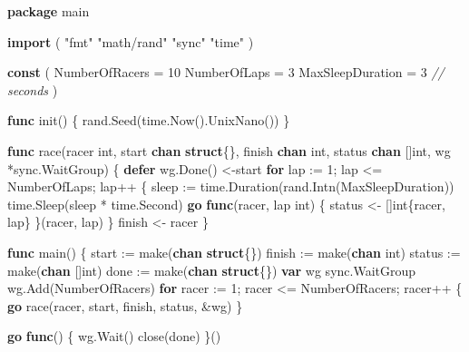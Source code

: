 \documentclass[]{book}
\newenvironment{Shaded}{\begin{snugshade}}{\end{snugshade}}
\newcommand{\BuiltInTok}[1]{#1}
\newcommand{\CommentTok}[1]{\textcolor[rgb]{0.56,0.35,0.01}{\textit{#1}}}
\newcommand{\DataTypeTok}[1]{\textcolor[rgb]{0.13,0.29,0.53}{#1}}
\newcommand{\DecValTok}[1]{\textcolor[rgb]{0.00,0.00,0.81}{#1}}
\newcommand{\KeywordTok}[1]{\textcolor[rgb]{0.13,0.29,0.53}{\textbf{#1}}}
\newcommand{\NormalTok}[1]{#1}
\newcommand{\StringTok}[1]{\textcolor[rgb]{0.31,0.60,0.02}{#1}}
\begin{document}
\begin{Shaded}
\begin{Highlighting}[]
\KeywordTok{package}\NormalTok{ main}

\KeywordTok{import}\NormalTok{ (}
    \StringTok{"fmt"}
    \StringTok{"math/rand"}
    \StringTok{"sync"}
    \StringTok{"time"}
\NormalTok{)}

\KeywordTok{const}\NormalTok{ (}
\NormalTok{    NumberOfRacers   = }\DecValTok{10}
\NormalTok{    NumberOfLaps     = }\DecValTok{3}
\NormalTok{    MaxSleepDuration = }\DecValTok{3} \CommentTok{// seconds}
\NormalTok{)}

\KeywordTok{func}\NormalTok{ init() \{}
\NormalTok{    rand.Seed(time.Now().UnixNano())}
\NormalTok{\}}

\KeywordTok{func}\NormalTok{ race(racer }\DataTypeTok{int}\NormalTok{, start }\KeywordTok{chan} \KeywordTok{struct}\NormalTok{\{\}, finish }\KeywordTok{chan} \DataTypeTok{int}\NormalTok{, status }\KeywordTok{chan}\NormalTok{ []}\DataTypeTok{int}\NormalTok{, wg *sync.WaitGroup) \{}
    \KeywordTok{defer}\NormalTok{ wg.Done()}
\NormalTok{    <-start}
    \KeywordTok{for}\NormalTok{ lap := }\DecValTok{1}\NormalTok{; lap <= NumberOfLaps; lap++ \{}
\NormalTok{        sleep := time.Duration(rand.Intn(MaxSleepDuration))}
\NormalTok{        time.Sleep(sleep * time.Second)}
        \KeywordTok{go} \KeywordTok{func}\NormalTok{(racer, lap }\DataTypeTok{int}\NormalTok{) \{}
\NormalTok{            status <- []}\DataTypeTok{int}\NormalTok{\{racer, lap\}}
\NormalTok{        \}(racer, lap)}
\NormalTok{    \}}
\NormalTok{    finish <- racer}
\NormalTok{\}}

\KeywordTok{func}\NormalTok{ main() \{}
\NormalTok{    start := }\BuiltInTok{make}\NormalTok{(}\KeywordTok{chan} \KeywordTok{struct}\NormalTok{\{\})}
\NormalTok{    finish := }\BuiltInTok{make}\NormalTok{(}\KeywordTok{chan} \DataTypeTok{int}\NormalTok{)}
\NormalTok{    status := }\BuiltInTok{make}\NormalTok{(}\KeywordTok{chan}\NormalTok{ []}\DataTypeTok{int}\NormalTok{)}
\NormalTok{    done := }\BuiltInTok{make}\NormalTok{(}\KeywordTok{chan} \KeywordTok{struct}\NormalTok{\{\})}
    \KeywordTok{var}\NormalTok{ wg sync.WaitGroup}
\NormalTok{    wg.Add(NumberOfRacers)}
    \KeywordTok{for}\NormalTok{ racer := }\DecValTok{1}\NormalTok{; racer <= NumberOfRacers; racer++ \{}
        \KeywordTok{go}\NormalTok{ race(racer, start, finish, status, &wg)}
\NormalTok{    \}}

    \KeywordTok{go} \KeywordTok{func}\NormalTok{() \{}
\NormalTok{        wg.Wait()}
        \BuiltInTok{close}\NormalTok{(done)}
\NormalTok{    \}()}


\end{Highlighting}
\end{Shaded}
\end{document}
